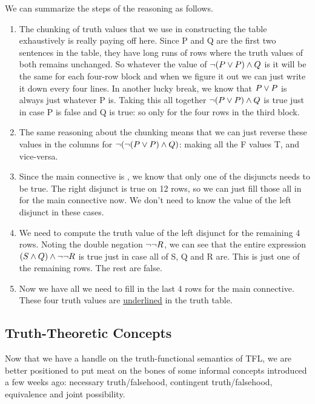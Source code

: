 We can summarize the steps of the reasoning as follows.

\begin{enumerate}
\item The chunking of truth values that we use in constructing the table
  exhaustively is really paying off here. Since P and Q are the first two
  sentences in the table, they have long runs of rows where the truth values of
  both remains unchanged. So whatever the value of $\neg(P \vee P) \wedge Q$ is
  it will be the same for each four-row block and when we figure it out we can
  just write it down every four lines. In another lucky break, we know that
  $P \vee P$ is always just whatever P is. Taking this all together
  $\neg(P \vee P) \wedge Q$ is true just in case P is false and Q is true: so
  only for the four rows in the third block.
\item The same reasoning about the chunking means that we can just reverse
  these values in the columns for $\neg(\neg(P \vee P) \wedge Q)$: making all
  the F values T, and vice-versa.
\item Since the main connective is \eor, we know that only one of the disjuncts
  needs to be true. The right disjunct is true on 12 rows, so we can just fill
  those all in for the main connective now. We don't need to know the value of
  the left disjunct in these cases.
\item We need to compute the truth value of the left disjunct for the remaining
  4 rows. Noting the double negation $\neg\neg R$, we can see that the entire
  expression $(S \wedge Q)\wedge\neg\neg R$ is true just in case all of S, Q and
  R are. This is just one of the remaining rows. The rest are false.
\item Now we have all we need to fill in the last 4 rows for the main
  connective. These four truth values are \underline{underlined} in the truth
  table.
\end{enumerate}


\subsection{Truth-Theoretic Concepts}

Now that we have a handle on the truth-functional semantics of TFL, we are
better positioned to put meat on the bones of some informal concepts introduced
a few weeks ago: necessary truth/falsehood, contingent truth/falsehood,
equivalence and joint possibility.

